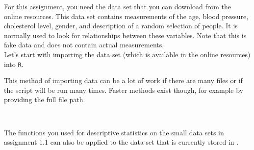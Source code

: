 

For this assignment, you need the  data set that you can download from the online resources. This data set contains measurements of the age, blood pressure, cholesterol level, gender, and description of a random selection of people. It is normally used to look for relationships between these variables. Note that this is fake data and does not contain actual measurements. \\

Let’s start with importing the data set (which is available in the online resources) into \texttt{R}. \\



This method of importing data can be a lot of work if there are many files or if the script will be run many times. Faster methods exist though, for example by providing the full file path. \\



 \\

\clearpage %

The functions you used for descriptive statistics on the small data sets in assignment 1.1 can also be applied to the data set that is currently stored in . \\


